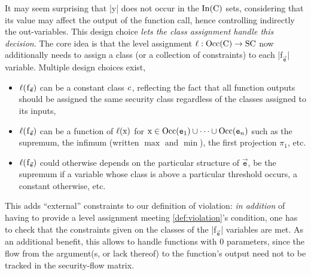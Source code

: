 It may seem surprising that \prc|y| does not occur in the \(\In(\prc|C|)\) sets,
considering that its value may affect the output of the function call, hence
controlling indirectly the out-variables. This design choice \emph{lets the
class assignment handle this decision}. The core idea is that the level
assignment \(\ell : \Occ(\prc|C|) \to \SC\) now additionally needs to assign a
class (or a collection of constraints) to each \prc|f$_{\vec{\mathtt{e}}}$|
variable. Multiple design choices exist, \eg

\begin{itemize}
\item \(\ell(\prc|f$_{\vec{\mathtt{e}}}$|)\) can be a constant class
\(\mathit{c}\), reflecting the fact that all function outputs should be assigned
the same security class regardless of the classes assigned to its inputs,

\item \(\ell(\prc|f$_{\vec{\mathtt{e}}}$|)\) can be a function of
\(\lvl{\prc|x|}\) for \(\prc|x| \in \Occ(\mathtt{e}_1) \cup \cdots \cup
\Occ(\mathtt{e}_n)\) such as the supremum, the infimum (written \(\max\) and
\(\min\)), the first projection \(\pi_1\), etc.

\item \(\ell(\prc|f$_{\vec{\mathtt{e}}}$|)\) could otherwise depends on the
particular structure of \(\vec{\mathtt{e}}\), \eg be the supremum if a variable
whose class is above a particular threshold occurs, a constant otherwise, etc.
\end{itemize}

This adds \enquote{external} constraints to our definition of violation:
\emph{in addition} of having to provide a level assignment meeting
\autoref{def:violation}'s condition, one has to check that the constraints given
on the classes of the \prc|f$_{\vec{\mathtt{e}}}$| variables are met. As an
additional benefit, this allows to handle functions with \(0\) parameters, since
the flow from the argument(s, or lack thereof) to the function's output need not
to be tracked in the security-flow matrix.

